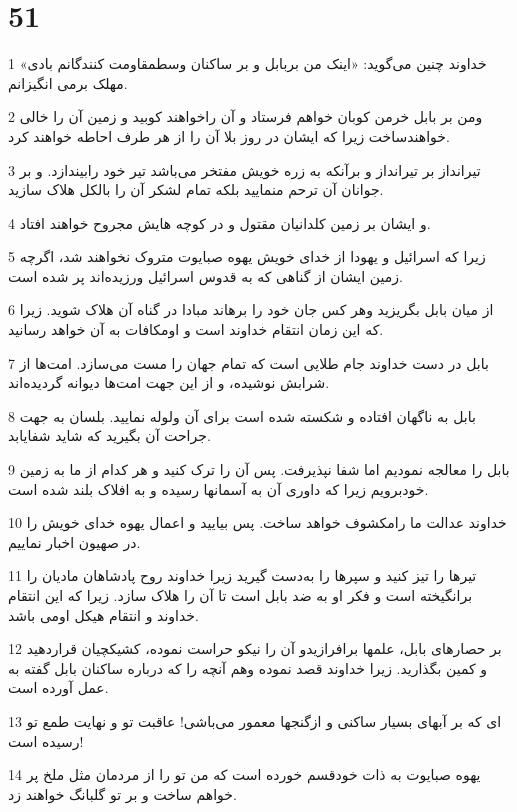 \chapter{51}

\par 1 «خداوند چنین می‌گوید: «اینک من بربابل و بر ساکنان وسطمقاومت کنندگانم بادی مهلک برمی انگیزانم.
\par 2 ومن بر بابل خرمن کوبان خواهم فرستاد و آن راخواهند کوبید و زمین آن را خالی خواهندساخت زیرا که ایشان در روز بلا آن را از هر طرف احاطه خواهند کرد.
\par 3 تیرانداز بر تیرانداز و برآنکه به زره خویش مفتخر می‌باشد تیر خود رابیندازد. و بر جوانان آن ترحم منمایید بلکه تمام لشکر آن را بالکل هلاک سازید.
\par 4 و ایشان بر زمین کلدانیان مقتول و در کوچه هایش مجروح خواهند افتاد.
\par 5 زیرا که اسرائیل و یهودا از خدای خویش یهوه صبایوت متروک نخواهند شد، اگرچه زمین ایشان از گناهی که به قدوس اسرائیل ورزیده‌اند پر شده است.
\par 6 از میان بابل بگریزید وهر کس جان خود را برهاند مبادا در گناه آن هلاک شوید. زیرا که این زمان انتقام خداوند است و اومکافات به آن خواهد رسانید.
\par 7 بابل در دست خداوند جام طلایی است که تمام جهان را مست می‌سازد. امت‌ها از شرابش نوشیده، و از این جهت امت‌ها دیوانه گردیده‌اند.
\par 8 بابل به ناگهان افتاده و شکسته شده است برای آن ولوله نمایید. بلسان به جهت جراحت آن بگیرید که شاید شفایابد.
\par 9 بابل را معالجه نمودیم اما شفا نپذیرفت. پس آن را ترک کنید و هر کدام از ما به زمین خودبرویم زیرا که داوری آن به آسمانها رسیده و به افلاک بلند شده است.
\par 10 خداوند عدالت ما رامکشوف خواهد ساخت. پس بیایید و اعمال یهوه خدای خویش را در صهیون اخبار نماییم.
\par 11 تیرها را تیز کنید و سپرها را به‌دست گیرید زیرا خداوند روح پادشاهان مادیان را برانگیخته است و فکر او به ضد بابل است تا آن را هلاک سازد. زیرا که این انتقام خداوند و انتقام هیکل اومی باشد.
\par 12 بر حصارهای بابل، علمها برافرازیدو آن را نیکو حراست نموده، کشیکچیان قراردهید و کمین بگذارید. زیرا خداوند قصد نموده وهم آنچه را که درباره ساکنان بابل گفته به عمل آورده است.
\par 13 ‌ای که بر آبهای بسیار ساکنی و ازگنجها معمور می‌باشی! عاقبت تو و نهایت طمع تو رسیده است!
\par 14 یهوه صبایوت به ذات خودقسم خورده است که من تو را از مردمان مثل ملخ پر خواهم ساخت و بر تو گلبانگ خواهند زد.
